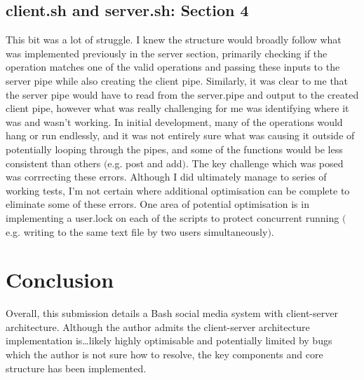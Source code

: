 \documentclass[11pt]{article}
\theoremstyle{plain}
\theoremstyle{definition}
\begin{document}
\subsection{client.sh and server.sh: Section 4}\label{subsection: client}
This bit was a lot of struggle. I knew the structure would broadly follow what was implemented previously in the server section, primarily checking if the operation matches one of the valid operations and passing these inputs to the server pipe while also creating the client pipe. Similarly, it was clear to me that the server pipe would have to read from the server.pipe and output to the created client pipe, however what was really challenging for me was identifying where it was and wasn't working. In initial development, many of the operations would hang or run endlessly, and it was not entirely sure what was causing it outside of potentially looping through the pipes, and some of the functions would be less consistent than others $($e.g. post and add$)$. The key challenge which was posed was corrrecting these errors. Although I did ultimately manage to series of working tests, I'm not certain where additional optimisation can be complete to eliminate some of these errors. One area of potential optimisation is in implementing a user.lock on each of the scripts to protect concurrent running $($e.g. writing to the same text file by two users simultaneously$)$.
\pagebreak
\section{Conclusion}\label{section:Conclusion} 
Overall, this submission details a Bash social media system with client-server architecture. Although the author admits the client-server architecture implementation is\dots likely highly optimisable and potentially limited by bugs which the author is not sure how to resolve, the key components and core structure has been implemented.
\end{document}
